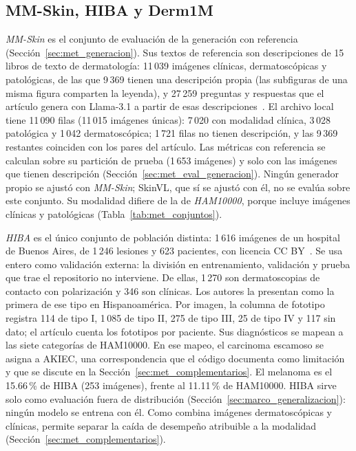 \subsection{MM-Skin, HIBA y Derm1M}

\emph{MM-Skin} es el conjunto de evaluación de la generación con referencia (Sección~\ref{sec:met_generacion}). Sus textos
de referencia son descripciones de 15 libros de texto de dermatología: 11\,039 imágenes clínicas, dermatoscópicas y
patológicas, de las que 9\,369 tienen una descripción propia (las subfiguras de una misma figura comparten la
leyenda), y 27\,259 preguntas y respuestas que el artículo genera con Llama-3.1 a partir de esas
descripciones~\cite{zeng2025mmskin}. El archivo local tiene 11\,090 filas (11\,015 imágenes únicas): 7\,020 con
modalidad clínica, 3\,028 patológica y 1\,042 dermatoscópica; 1\,721 filas no tienen descripción, y las 9\,369
restantes coinciden con los pares del artículo. Las métricas con referencia se calculan sobre su partición de prueba (1\,653 imágenes) y solo con las imágenes que
tienen descripción (Sección~\ref{sec:met_eval_generacion}). Ningún generador propio se ajustó con \emph{MM-Skin};
SkinVL, que sí se ajustó con él, no se evalúa sobre este conjunto.
Su modalidad difiere de la de \emph{HAM10000}, porque incluye imágenes clínicas y patológicas
(Tabla~\ref{tab:met_conjuntos}).

\emph{HIBA} es el único conjunto de población distinta: 1\,616 imágenes de un hospital de Buenos Aires, de 1\,246 lesiones
y 623 pacientes, con licencia CC BY~\cite{riccilara2023dataset}. Se usa entero como validación externa: la división
en entrenamiento, validación y prueba que trae el repositorio no interviene.
De ellas, 1\,270 son dermatoscopias de contacto con polarización y 346 son clínicas. Los autores la presentan como la
primera de ese tipo en Hispanoamérica. Por imagen, la columna de fototipo registra 114 de tipo I, 1\,085 de tipo II,
275 de tipo III, 25 de tipo IV y 117 sin dato; el artículo cuenta los fototipos por paciente. Sus diagnósticos se mapean
a las siete categorías de HAM10000. En ese mapeo, el carcinoma escamoso se asigna a AKIEC, una correspondencia que el
código documenta como limitación y que se discute en la Sección~\ref{sec:met_complementarios}. El melanoma es el 15.66\,\%
de HIBA (253 imágenes), frente al 11.11\,\% de HAM10000. HIBA sirve solo como evaluación fuera de distribución
(Sección~\ref{sec:marco_generalizacion}): ningún modelo se entrena con él. Como combina imágenes dermatoscópicas y clínicas,
permite separar la caída de desempeño atribuible a la modalidad (Sección~\ref{sec:met_complementarios}).


